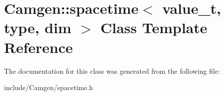 \hypertarget{a00513}{}\section{Camgen\+:\+:spacetime$<$ value\+\_\+t, type, dim $>$ Class Template Reference}
\label{a00513}


The documentation for this class was generated from the following file\+:\begin{DoxyCompactItemize}
\item 
include/\+Camgen/spacetime.\+h\end{DoxyCompactItemize}
